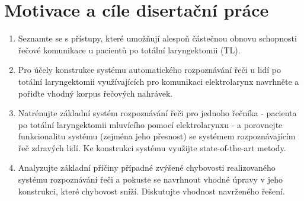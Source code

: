 \chapter{Motivace a cíle disertační práce}
\label{chap:mot}

\begin{enumerate}
  \item Seznamte se s přístupy, které umožňují alespoň částečnou obnovu schopnosti řečové komunikace u pacientů po totální laryngektomii (TL).
  \item Pro účely konstrukce systému automatického rozpoznávání řeči u lidí po totální laryngektomii využívajících pro komunikaci elektrolarynx navrhněte a pořiďte vhodný korpus řečových nahrávek.
  \item Natrénujte základní systém rozpoznávání řeči pro jednoho řečníka - pacienta po totální laryngektomii mluvícího pomocí elektrolarynxu - a porovnejte funkcionalitu systému (zejména jeho přesnost) se systémem rozpoznávajícím řeč zdravých lidí. Ke konstrukci systému využijte state-of-the-art metody.
  \item Analyzujte základní příčiny případné zvýšené chybovosti realizovaného systému rozpoznávání řeči a pokuste se navrhnout vhodné úpravy v jeho konstrukci, které chybovost sníží. Diskutujte vhodnost navrženého řešení.
\end{enumerate}
